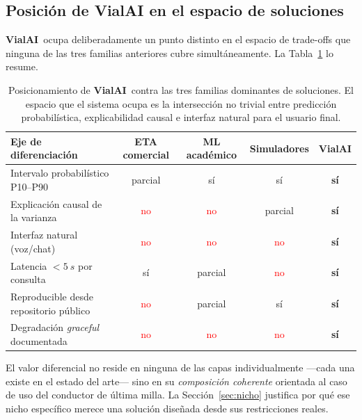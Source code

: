 \documentclass[11pt,a4paper]{article}
\newcommand{\VialAI}{\textbf{\textcolor{vialTeal}{Vial}\textcolor{vialAmber}{AI}}}
\begin{document}
\subsection{Posición de VialAI en el espacio de soluciones}

\VialAI\ ocupa deliberadamente un punto distinto en el espacio
de trade-offs que ninguna de las tres familias anteriores cubre
simultáneamente. La Tabla~\ref{tab:posicionamiento} lo resume.

\begin{table}[H]
\centering
\small
\renewcommand{\arraystretch}{1.3}
\begin{tabularx}{\linewidth}{@{}X c c c c@{}}
\toprule
\rowcolor{vialNavy!10}
\textbf{Eje de diferenciación} & \textbf{ETA comercial} &
\textbf{ML académico} & \textbf{Simuladores} &
\textbf{\VialAI} \\
\midrule
Intervalo probabilístico P10--P90 & \textcolor{vialAmber}{parcial} &
\textcolor{vialGreen}{sí} & \textcolor{vialGreen}{sí} &
\textcolor{vialGreen}{\textbf{sí}} \\
Explicación causal de la varianza & \textcolor{red}{no} &
\textcolor{red}{no} & \textcolor{vialAmber}{parcial} &
\textcolor{vialGreen}{\textbf{sí}} \\
Interfaz natural (voz/chat) & \textcolor{red}{no} &
\textcolor{red}{no} & \textcolor{red}{no} &
\textcolor{vialGreen}{\textbf{sí}} \\
Latencia $<\SI{5}{s}$ por consulta &
\textcolor{vialGreen}{sí} & \textcolor{vialAmber}{parcial} &
\textcolor{red}{no} & \textcolor{vialGreen}{\textbf{sí}} \\
Reproducible desde repositorio público &
\textcolor{red}{no} & \textcolor{vialAmber}{parcial} &
\textcolor{vialGreen}{sí} & \textcolor{vialGreen}{\textbf{sí}} \\
Degradación \emph{graceful} documentada &
\textcolor{red}{no} & \textcolor{red}{no} & \textcolor{red}{no} &
\textcolor{vialGreen}{\textbf{sí}} \\
\bottomrule
\end{tabularx}
\caption{Posicionamiento de \VialAI\ contra las tres familias
dominantes de soluciones. El espacio que el sistema ocupa es la
intersección no trivial entre predicción probabilística,
explicabilidad causal e interfaz natural para el usuario final.}
\label{tab:posicionamiento}
\end{table}

El valor diferencial no reside en ninguna de las capas
individualmente ---cada una existe en el estado del arte--- sino
en su \emph{composición coherente} orientada al caso de uso del
conductor de última milla. La Sección~\ref{sec:nicho} justifica
por qué ese nicho específico merece una solución diseñada desde
sus restricciones reales.
\end{document}

